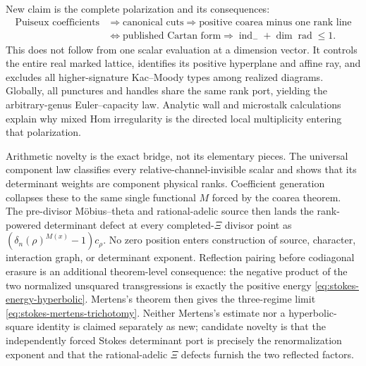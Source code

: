 \documentclass[11pt,a4paper]{amsart}
\theoremstyle{plain}
\theoremstyle{definition}
\newcommand{\indm}{\operatorname{ind}_{-}}
\newcommand{\Rad}{\operatorname{rad}}
\begin{document}
New claim is the complete polarization and its consequences:
\begin{align*}
 \text{Puiseux coefficients}&\Longrightarrow\text{canonical cuts}
 \Longrightarrow\text{positive coarea minus one rank line}\\
 &\Longleftrightarrow\text{published Cartan form}
 \Longrightarrow \indm+\dim\Rad\leq1.
\end{align*}
This does not follow from one scalar evaluation at a dimension vector.  It controls the entire
real marked lattice, identifies its positive hyperplane and affine ray, and excludes all
higher-signature Kac--Moody types among realized diagrams.  Globally, all punctures and handles
share the same rank port, yielding the arbitrary-genus Euler--capacity law.  Analytic wall and
microstalk calculations explain why mixed Hom irregularity is the directed local multiplicity
entering that polarization.

Arithmetic novelty is the exact bridge, not its elementary pieces.  The universal component law
classifies every relative-channel-invisible scalar and shows that its determinant weights are
component physical ranks.  Coefficient generation collapses these to the same single functional
$M$ forced by the coarea theorem.  The pre-divisor M\"obius--theta and rational-adelic source then
lands the rank-powered determinant defect at every completed-$\Xi$ divisor point as
$(\delta_n(\rho)^{M(x)}-1)c_\rho$.  No zero position enters construction of source, character,
interaction graph, or determinant exponent.
Reflection pairing before codiagonal erasure is an additional theorem-level consequence: the
negative product of the two normalized unsquared transgressions is exactly the positive energy
\eqref{eq:stokes-energy-hyperbolic}.  Mertens's theorem then gives the three-regime limit
\eqref{eq:stokes-mertens-trichotomy}.  Neither Mertens's estimate nor a hyperbolic-square identity
is claimed separately as new; candidate novelty is that the independently forced Stokes
determinant port is precisely the renormalization exponent and that the rational-adelic $\Xi$
defects furnish the two reflected factors.
\end{document}
